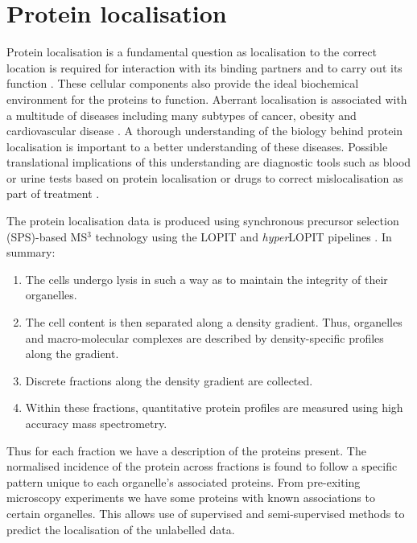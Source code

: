 \documentclass[11pt]{article} %
\begin{document}
\section{Protein localisation}
Protein localisation is a fundamental question as localisation to the correct location is required for interaction with its binding partners and to carry out its function \cite{GibsonCellregulationdetermined2009}. These cellular components also provide the ideal biochemical environment for the proteins to function. Aberrant localisation is associated with a multitude of diseases including many subtypes of cancer, obesity and cardiovascular disease \cite{SiljeeSubcellularlocalizationMC4R2018a}\cite{HungProteinlocalizationdisease2011a}\cite{KauNucleartransportcancer2004a}. A thorough understanding of the biology behind protein localisation is important to a better understanding of these diseases. Possible translational implications of this understanding are diagnostic tools such as blood or urine tests based on protein localisation or drugs to correct mislocalisation as part of treatment \cite{KauNucleartransportcancer2004a}\cite{HorganOmictechnologiesgenomics2011a}.

The protein localisation data is produced using synchronous precursor selection (SPS)-based MS$^3$ technology using the LOPIT and \emph{hyper}LOPIT pipelines \cite{GeladakiLOPITDCsimplerapproach2018}\cite{DunkleyLocalizationOrganelleProteins2004}. In summary:
\begin{enumerate}
 \item The cells undergo lysis in such a way as to maintain the integrity of their organelles.
 \item The cell content is then separated along a density gradient. Thus, organelles and macro-molecular complexes are described by density-specific profiles along the gradient.
 \item Discrete fractions along the density gradient are collected.
 \item Within these fractions, quantitative protein profiles are measured using high accuracy mass spectrometry.
\end{enumerate}
Thus for each fraction we have a description of the proteins present. The normalised incidence of the protein across fractions is found to follow a specific pattern unique to each organelle's associated proteins. From pre-exiting microscopy experiments we have some proteins with known associations to certain organelles. This allows use of supervised and semi-supervised methods to predict the localisation of the unlabelled data.
\end{document}
